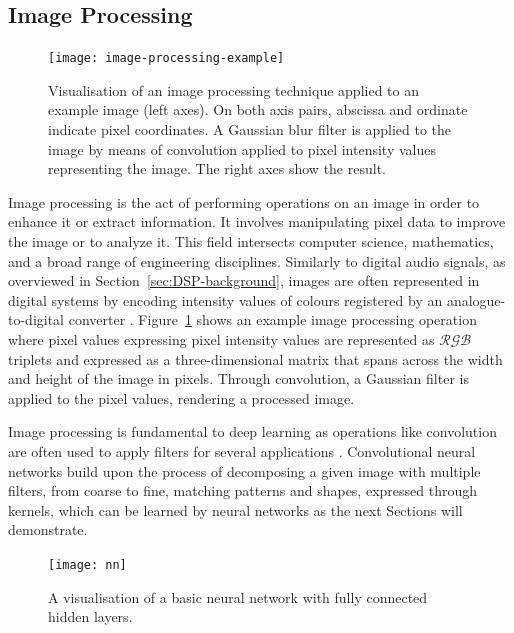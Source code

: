 \subsection{Image Processing}
\begin{figure}[htbp]
    \centering
    \texttt{[image: image-processing-example]}
    \caption[Image processing example --- Gaussian filter]{Visualisation of an image processing technique applied to an example image (left axes). On both axis pairs, abscissa and ordinate indicate pixel coordinates. A Gaussian blur filter is applied to the image by means of convolution applied to pixel intensity values representing the image. The right axes show the result.}\label{fig:image-gaussian-filter}
\end{figure}
Image processing is the act of performing operations on an image in order to enhance it or extract information. It involves manipulating pixel data to improve the image or to analyze it. This field intersects computer science, mathematics, and a broad range of engineering disciplines. Similarly to digital audio signals, as overviewed in Section~\ref{sec:DSP-background}, images are often represented in digital systems by encoding intensity values of colours registered by an analogue-to-digital converter \citep{marschner2015fundamentals}.
Figure~\ref{fig:image-gaussian-filter} shows an example image processing operation where pixel values expressing pixel intensity values are represented as $\mathcal{RGB}$ triplets and expressed as a three-dimensional matrix that spans across the width and height of the image in pixels. Through convolution, a Gaussian filter is applied to the pixel values, rendering a processed image.\par
Image processing is fundamental to deep learning as operations like convolution are often used to apply filters for several applications \citep{goodfellow2016deep}. Convolutional neural networks build upon the process of decomposing a given image with multiple filters, from coarse to fine, matching patterns and shapes, expressed through kernels, which can be learned by neural networks as the next Sections will demonstrate.\par

\begin{figure}
    \centering
    \texttt{[image: nn]}
    \caption[Diagram of a fully connected neural network]{A visualisation of a basic neural network with fully connected hidden layers.}\label{fig:nn}
\end{figure}

